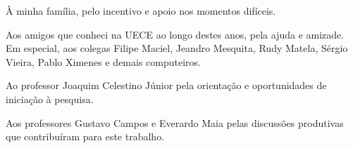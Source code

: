 













%
%

\capa
\folhaderosto
\makecippage
\termodeaprovacao


\noindent
À minha família, pelo incentivo e apoio nos momentos difíceis. 

\noindent
Aos amigos que conheci na UECE ao longo destes anos, pela ajuda e
amizade. Em especial, aos colegas Filipe Maciel, Jeandro Mesquita, Rudy Matela,
Sérgio Vieira, Pablo Ximenes e demais computeiros.

\noindent
Ao professor Joaquim Celestino Júnior pela orientação e oportunidades de
iniciação à pesquisa.

\noindent
Aos professores Gustavo Campos e Everardo Maia pelas discussões
produtivas que contribuíram para este trabalho. 

